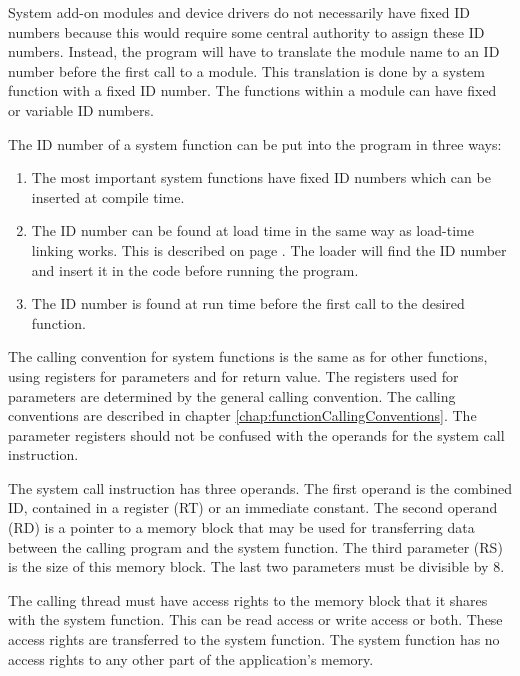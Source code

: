 \documentclass[forwardcom.tex]{subfiles}
\begin{document}
System add-on modules and device drivers do not necessarily have fixed ID numbers because this would require some central authority to assign these ID numbers. Instead, the program will have to translate the module name to an ID number before the first call to a module. This translation is done by a system function with a fixed ID number. The functions within a module can have fixed or variable ID numbers.
\vspace{2mm}

The ID number of a system function can be put into the program in three ways: 
\begin{enumerate}
\item The most important system functions have fixed ID numbers which can be inserted at compile time. 

\item The ID number can be found at load time in the same way as load-time linking works. This is described on page \pageref{loadTimeLinking}. 
The loader will find the ID number and insert it in the code before running the program. 

\item The ID number is found at run time before the first call to the desired function. 
\end{enumerate}

The calling convention for system functions is the same as for other functions, using registers for parameters and for return value. 
The registers used for parameters are determined by the general calling convention. 
The calling conventions are described in chapter \ref{chap:functionCallingConventions}.
The parameter registers should not be confused with the operands for the system call instruction. 
\vspace{2mm}

The system call instruction has three operands. The first operand is the combined ID, contained in a register (RT) or an immediate constant. The second operand (RD) is a pointer to a memory block that may be used for transferring data between the calling program and the system function. The third parameter (RS) is the size of this memory block. The last two parameters must be divisible by 8. 
\vspace{2mm}

The calling thread must have access rights to the memory block that it shares with the system 
function. This can be read access or write access or both. These access rights are transferred to the system function. The system function has no access rights to any other part of the application's memory.
\vspace{2mm}
\end{document}
